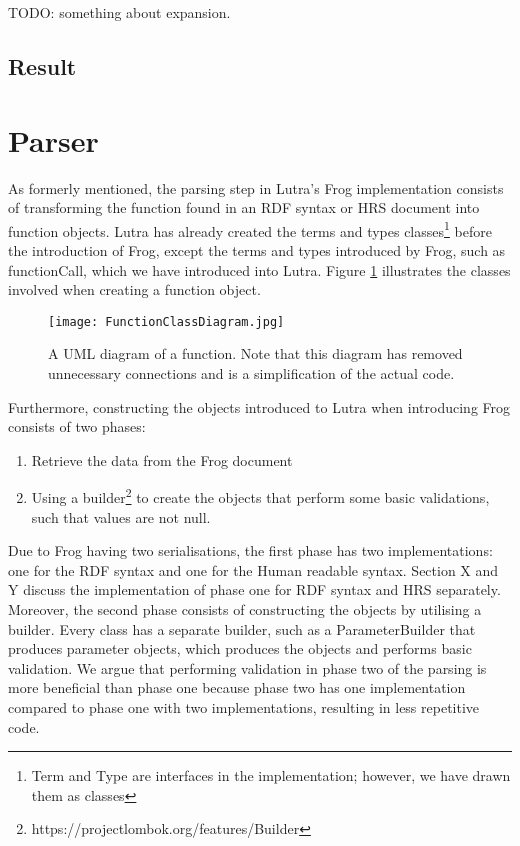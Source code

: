 \para
TODO: something about expansion. 

\subsection{Result}

\section{Parser}
\label{parser}
As formerly mentioned, the parsing step in Lutra's Frog implementation consists of transforming the function found in an RDF syntax or HRS document into function objects. Lutra has already created the terms and types classes\footnote{Term and Type are interfaces in the implementation; however, we have drawn them as classes} before the introduction of Frog, except the terms and types introduced by Frog, such as functionCall, which we have introduced into Lutra. Figure \ref{fig:FunctionClassDiagram} illustrates the classes involved when creating a function object.

\begin{figure}
  \centering
  \texttt{[image: FunctionClassDiagram.jpg]}
  \caption{A UML diagram of a function. Note that this diagram has removed unnecessary connections and is a simplification of the actual code.}
  \label{fig:FunctionClassDiagram}
\end{figure}

\para 
Furthermore, constructing the objects introduced to Lutra when introducing Frog consists of two phases:
\begin{enumerate}
  \item Retrieve the data from the Frog document
  \item Using a builder\footnote{https://projectlombok.org/features/Builder} to create the objects that perform some basic validations, such that values are not null. 
\end{enumerate}
Due to Frog having two serialisations, the first phase has two implementations: one for the RDF syntax and one for the Human readable syntax. Section X and Y discuss the implementation of phase one for RDF syntax and HRS separately. Moreover, the second phase consists of constructing the objects by utilising a builder. Every class has a separate builder, such as a ParameterBuilder that produces parameter objects, which produces the objects and performs basic validation. We argue that performing validation in phase two of the parsing is more beneficial than phase one because phase two has one implementation compared to phase one with two implementations, resulting in less repetitive code. 


